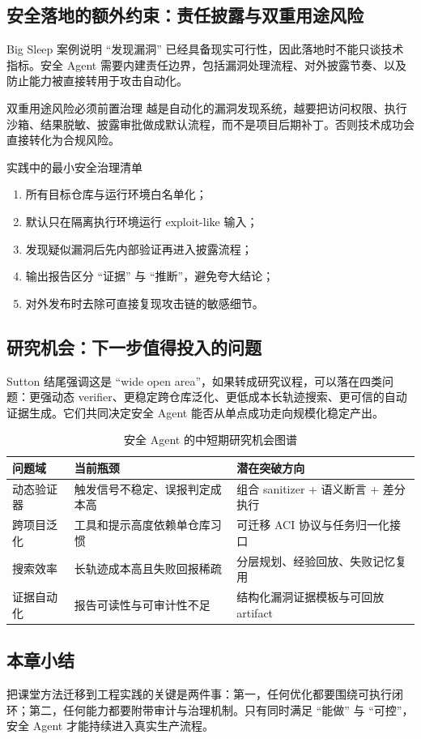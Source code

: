 \subsection{安全落地的额外约束：责任披露与双重用途风险}
Big Sleep 案例说明 ``发现漏洞'' 已经具备现实可行性，因此落地时不能只谈技术指标。安全 Agent 需要内建责任边界，包括漏洞处理流程、对外披露节奏、以及防止能力被直接转用于攻击自动化。

\begin{warningbox}{双重用途风险必须前置治理}
越是自动化的漏洞发现系统，越要把访问权限、执行沙箱、结果脱敏、披露审批做成默认流程，而不是项目后期补丁。否则技术成功会直接转化为合规风险。
\end{warningbox}

\begin{importantbox}{实践中的最小安全治理清单}
\begin{enumerate}
    \item 所有目标仓库与运行环境白名单化；
    \item 默认只在隔离执行环境运行 exploit-like 输入；
    \item 发现疑似漏洞后先内部验证再进入披露流程；
    \item 输出报告区分 ``证据'' 与 ``推断''，避免夸大结论；
    \item 对外发布时去除可直接复现攻击链的敏感细节。
\end{enumerate}
\end{importantbox}

\subsection{研究机会：下一步值得投入的问题}
Sutton 结尾强调这是 ``wide open area''，如果转成研究议程，可以落在四类问题：更强动态 verifier、更稳定跨仓库泛化、更低成本长轨迹搜索、更可信的自动证据生成。它们共同决定安全 Agent 能否从单点成功走向规模化稳定产出。

\begin{table}[H]
\centering
\begin{tabular}{p{3.0cm}p{4.4cm}p{4.8cm}}
\toprule
\textbf{问题域} & \textbf{当前瓶颈} & \textbf{潜在突破方向} \\
\midrule
动态验证器 & 触发信号不稳定、误报判定成本高 & 组合 sanitizer + 语义断言 + 差分执行 \\
跨项目泛化 & 工具和提示高度依赖单仓库习惯 & 可迁移 ACI 协议与任务归一化接口 \\
搜索效率 & 长轨迹成本高且失败回报稀疏 & 分层规划、经验回放、失败记忆复用 \\
证据自动化 & 报告可读性与可审计性不足 & 结构化漏洞证据模板与可回放 artifact \\
\bottomrule
\end{tabular}
\caption{安全 Agent 的中短期研究机会图谱}
\end{table}

\subsection{本章小结}
把课堂方法迁移到工程实践的关键是两件事：第一，任何优化都要围绕可执行闭环；第二，任何能力都要附带审计与治理机制。只有同时满足 ``能做'' 与 ``可控''，安全 Agent 才能持续进入真实生产流程。

